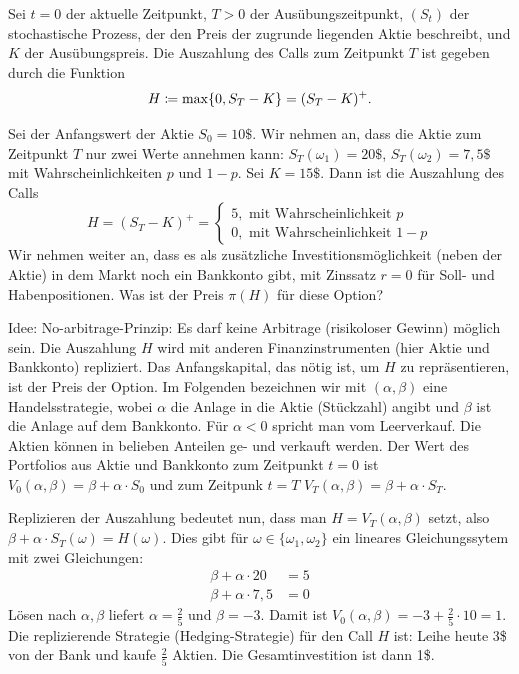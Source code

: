 \documentclass[a4paper,twoside,DIV15,BCOR12mm]{scrbook}
\begin{document}
\begin{beispiel}
Sei $t=0$ der aktuelle Zeitpunkt, $T>0$ der Ausübungszeitpunkt, $(S_t)$ der stochastische Prozess, der den Preis der zugrunde liegenden Aktie beschreibt, und $K$ der Ausübungspreis. Die Auszahlung des Calls zum Zeitpunkt $T$ ist gegeben durch die Funktion 
\[
H \da \max\{0,S_T - K\} = (S_T-K)^+.
\]

Sei der Anfangswert der Aktie $S_0=10\$$. Wir nehmen an, dass die Aktie zum Zeitpunkt $T$ nur zwei Werte annehmen kann: $S_T(\omega_1) = 20\$$, $S_T(\omega_2) = 7,5\$$ mit Wahrscheinlichkeiten $p$ und $1-p$. Sei $K=15\$$. Dann ist die Auszahlung des Calls
\[
H= (S_T-K)^+ = 
\begin{cases}
5, \text{ mit Wahrscheinlichkeit $p$}\\
0, \text{ mit Wahrscheinlichkeit $1-p$}
\end{cases}
\]
Wir nehmen weiter an, dass es als zusätzliche Investitionsmöglichkeit (neben der Aktie) in dem Markt noch ein Bankkonto gibt, mit Zinssatz $r=0$ für Soll- und Habenpositionen. Was ist der Preis $\pi(H)$ für diese Option?

Idee: No-arbitrage-Prinzip: Es darf keine Arbitrage (risikoloser Gewinn) möglich sein. Die Auszahlung $H$ wird mit anderen Finanzinstrumenten (hier Aktie und Bankkonto) repliziert. Das Anfangskapital, das nötig ist, um $H$ zu repräsentieren, ist der Preis der Option. Im Folgenden bezeichnen wir mit $(\alpha, \beta)$ eine Handelsstrategie, wobei $\alpha$ die Anlage in die Aktie (Stückzahl) angibt und $\beta$ ist die Anlage auf dem Bankkonto. Für $\alpha<0$ spricht man vom Leerverkauf. Die Aktien können in belieben Anteilen ge- und verkauft werden. Der Wert des Portfolios aus Aktie und Bankkonto zum Zeitpunkt $t=0$ ist $V_0(\alpha,\beta) = \beta + \alpha\cdot S_0$ und zum Zeitpunk $t=T$ $V_T(\alpha,\beta) = \beta + \alpha \cdot S_T$.

Replizieren der Auszahlung bedeutet nun, dass man $H=V_T(\alpha,\beta)$ setzt, also $\beta + \alpha \cdot S_T(\omega) = H(\omega)$. Dies gibt für $\omega \in \{\omega_1,\omega_2\}$ ein lineares Gleichungssytem mit zwei Gleichungen:
\begin{align*}
\beta + \alpha \cdot 20  &= 5 \\
\beta + \alpha \cdot 7,5  &= 0 
\end{align*}
Lösen nach $\alpha, \beta$ liefert $\alpha=\frac 25$ und $\beta = -3$. Damit ist $V_0(\alpha,\beta) = -3 + \frac25\cdot 10 = 1$. Die replizierende Strategie (Hedging-Strategie) für den Call $H$ ist: Leihe heute 3\$ von der Bank und kaufe $\frac25$ Aktien. Die Gesamtinvestition ist dann 1\$.


\end{beispiel}
\end{document}

